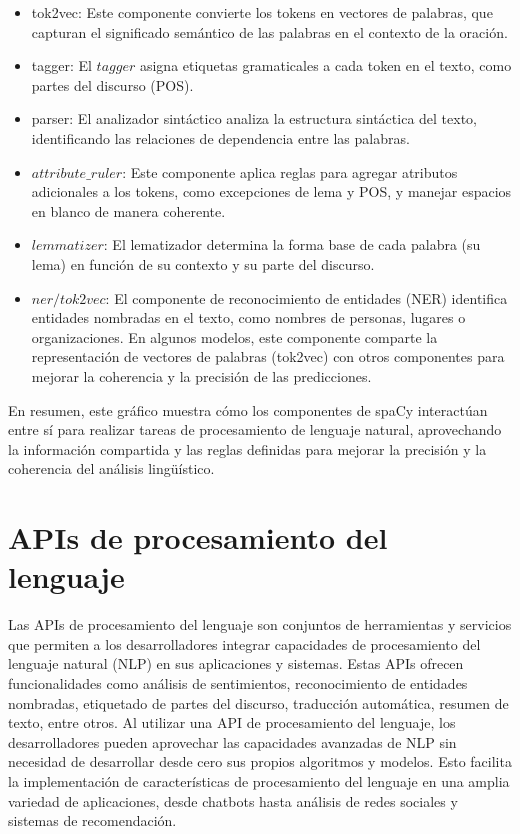 \begin{itemize}
	\item tok2vec: Este componente convierte los tokens en vectores de palabras, que capturan el significado semántico de las palabras en el contexto de la oración.
	\item tagger: El $tagger$ asigna etiquetas gramaticales a cada token en el texto, como partes del discurso (POS).
	\item  parser: El analizador sintáctico analiza la estructura sintáctica del texto, identificando las relaciones de dependencia entre las palabras. 
	\item $attribute\_ruler$: Este componente aplica reglas para agregar atributos adicionales a los tokens, como excepciones de lema y POS, y manejar espacios en blanco de manera coherente.
	\item $lemmatizer$: El lematizador determina la forma base de cada palabra (su lema) en función de su contexto y su parte del discurso.
	\item $ner/tok2vec$: El componente de reconocimiento de entidades (NER) identifica entidades nombradas en el texto, como nombres de personas, lugares o organizaciones. En algunos modelos, este componente comparte la representación de vectores de palabras (tok2vec) con otros componentes para mejorar la coherencia y la precisión de las predicciones.
\end{itemize}
En resumen, este gráfico muestra cómo los componentes de spaCy interactúan entre sí para realizar tareas de procesamiento de lenguaje natural, aprovechando la información compartida y las reglas definidas para mejorar la precisión y la coherencia del análisis lingüístico.

\section{APIs de procesamiento del lenguaje}

Las APIs de procesamiento del lenguaje son conjuntos de herramientas y servicios que permiten a los desarrolladores integrar capacidades de procesamiento del lenguaje natural (NLP) en sus aplicaciones y sistemas. Estas APIs ofrecen funcionalidades como análisis de sentimientos, reconocimiento de entidades nombradas, etiquetado de partes del discurso, traducción automática, resumen de texto, entre otros. Al utilizar una API de procesamiento del lenguaje, los desarrolladores pueden aprovechar las capacidades avanzadas de NLP sin necesidad de desarrollar desde cero sus propios algoritmos y modelos. Esto facilita la implementación de características de procesamiento del lenguaje en una amplia variedad de aplicaciones, desde chatbots hasta análisis de redes sociales y sistemas de recomendación.

